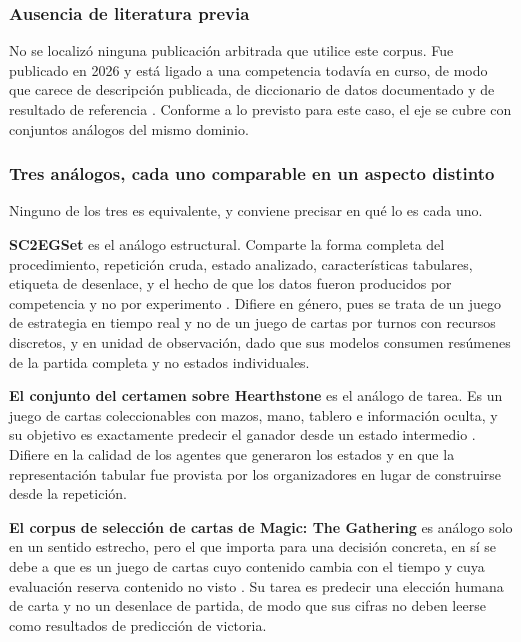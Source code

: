 \subsubsection{Ausencia de literatura previa}

No se localizó ninguna publicación arbitrada que utilice este corpus. Fue
publicado en 2026 y está ligado a una competencia todavía en curso, de modo
que carece de descripción publicada, de diccionario de datos documentado y
de resultado de referencia \cite{ptcg_dataset_2026}. Conforme a lo previsto
para este caso, el eje se cubre con conjuntos análogos del mismo dominio.

\subsubsection{Tres análogos, cada uno comparable en un aspecto distinto}

Ninguno de los tres es equivalente, y conviene precisar en qué lo es cada
uno.

\textbf{SC2EGSet} es el análogo estructural. Comparte la forma completa del
procedimiento, repetición cruda, estado analizado, características
tabulares, etiqueta de desenlace, y el hecho de que los datos fueron
producidos por competencia y no por experimento
\cite{bialecki_sc2egset_2023}. Difiere en género, pues se trata de un juego
de estrategia en tiempo real y no de un juego de cartas por turnos con
recursos discretos, y en unidad de observación, dado que sus modelos
consumen resúmenes de la partida completa y no estados individuales.

\textbf{El conjunto del certamen sobre Hearthstone} es el análogo de tarea.
Es un juego de cartas coleccionables con mazos, mano, tablero e información
oculta, y su objetivo es exactamente predecir el ganador desde un estado
intermedio \cite{janusz_hearthstone_2017}. Difiere en la calidad de los
agentes que generaron los estados y en que la representación tabular fue
provista por los organizadores en lugar de construirse desde la repetición.

\textbf{El corpus de selección de cartas de Magic: The Gathering} es análogo
solo en un sentido estrecho, pero el que importa para una decisión concreta, en sí se debe a que
es un juego de cartas cuyo contenido cambia con el tiempo y cuya evaluación
reserva contenido no visto \cite{bertram_cardrepresentations_2024}. Su tarea
es predecir una elección humana de carta y no un desenlace de partida, de
modo que sus cifras no deben leerse como resultados de predicción de
victoria.

